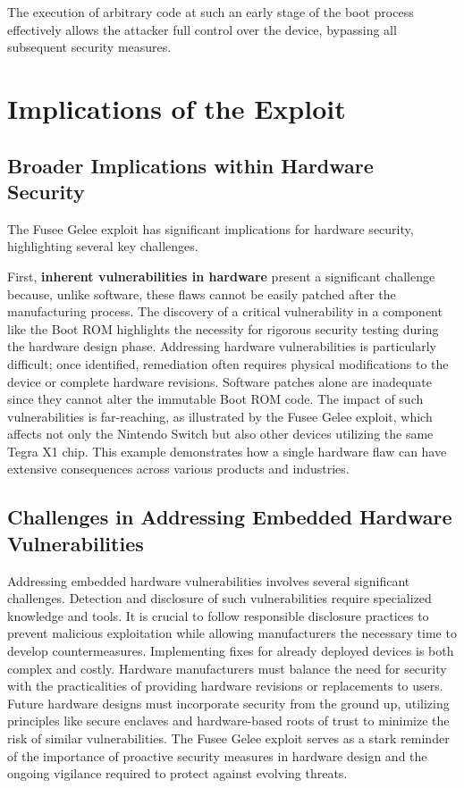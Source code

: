 The execution of arbitrary code at such an early stage of the boot process effectively allows the attacker full control over the device, bypassing all subsequent security measures.

\section{Implications of the Exploit}

\subsection{Broader Implications within Hardware Security}

The Fusee Gelee exploit has significant implications for hardware security, highlighting several key challenges.

First, \textbf{inherent vulnerabilities in hardware} present a significant challenge because, unlike software, these flaws cannot be easily patched after the manufacturing process. The discovery of a critical vulnerability in a component like the Boot ROM highlights the necessity for rigorous security testing during the hardware design phase. Addressing hardware vulnerabilities is particularly difficult; once identified, remediation often requires physical modifications to the device or complete hardware revisions. Software patches alone are inadequate since they cannot alter the immutable Boot ROM code. The impact of such vulnerabilities is far-reaching, as illustrated by the Fusee Gelee exploit, which affects not only the Nintendo Switch but also other devices utilizing the same Tegra X1 chip. This example demonstrates how a single hardware flaw can have extensive consequences across various products and industries.

\subsection{Challenges in Addressing Embedded Hardware Vulnerabilities}

Addressing embedded hardware vulnerabilities involves several significant challenges. Detection and disclosure of such vulnerabilities require specialized knowledge and tools. It is crucial to follow responsible disclosure practices to prevent malicious exploitation while allowing manufacturers the necessary time to develop countermeasures. Implementing fixes for already deployed devices is both complex and costly. Hardware manufacturers must balance the need for security with the practicalities of providing hardware revisions or replacements to users. Future hardware designs must incorporate security from the ground up, utilizing principles like secure enclaves and hardware-based roots of trust to minimize the risk of similar vulnerabilities. The Fusee Gelee exploit serves as a stark reminder of the importance of proactive security measures in hardware design and the ongoing vigilance required to protect against evolving threats.